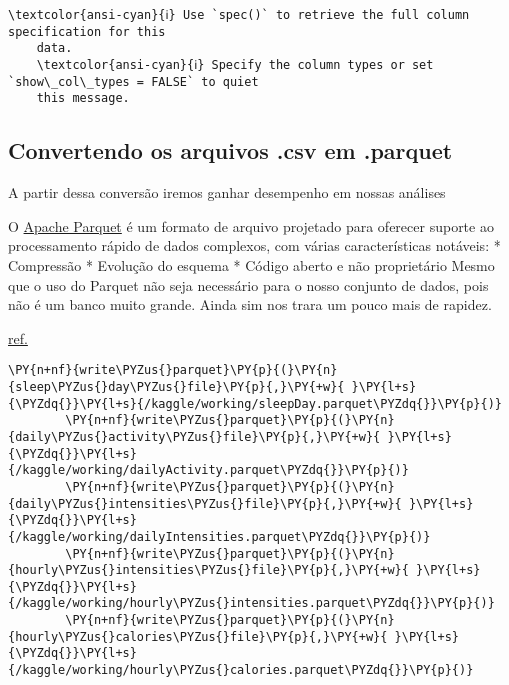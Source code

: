 \begin{Verbatim}[commandchars=\\\{\}]
    \textcolor{ansi-cyan}{ℹ} Use `spec()` to retrieve the full column specification for this
    data.
    \textcolor{ansi-cyan}{ℹ} Specify the column types or set `show\_col\_types = FALSE` to quiet
    this message.
\end{Verbatim}

\subsection{Convertendo os arquivos .csv em .parquet}

A partir dessa conversão iremos ganhar desempenho em nossas análises

O \href{https://www.upsolver.com/blog/apache-parquet-why-use}{Apache
    Parquet} é um formato de arquivo projetado para oferecer suporte ao
processamento rápido de dados complexos, com várias características
notáveis: * Compressão * Evolução do esquema * Código aberto e não
proprietário Mesmo que o uso do Parquet não seja necessário para o nosso
conjunto de dados, pois não é um banco muito grande. Ainda sim nos trara
um pouco mais de rapidez.

\begin{center}
\end{center}

\href{https://blog.openbridge.com/how-to-be-a-hero-with-powerful-parquet-google-and-amazon-f2ae0f35ee04}{ref.}

\begin{tcolorbox}[breakable, size=fbox, boxrule=1pt, pad at break*=1mm,colback=cellbackground, colframe=cellborder]
    \begin{Verbatim}[commandchars=\\\{\}]
        \PY{n+nf}{write\PYZus{}parquet}\PY{p}{(}\PY{n}{sleep\PYZus{}day\PYZus{}file}\PY{p}{,}\PY{+w}{ }\PY{l+s}{\PYZdq{}}\PY{l+s}{/kaggle/working/sleepDay.parquet\PYZdq{}}\PY{p}{)}
        \PY{n+nf}{write\PYZus{}parquet}\PY{p}{(}\PY{n}{daily\PYZus{}activity\PYZus{}file}\PY{p}{,}\PY{+w}{ }\PY{l+s}{\PYZdq{}}\PY{l+s}{/kaggle/working/dailyActivity.parquet\PYZdq{}}\PY{p}{)}
        \PY{n+nf}{write\PYZus{}parquet}\PY{p}{(}\PY{n}{daily\PYZus{}intensities\PYZus{}file}\PY{p}{,}\PY{+w}{ }\PY{l+s}{\PYZdq{}}\PY{l+s}{/kaggle/working/dailyIntensities.parquet\PYZdq{}}\PY{p}{)}
        \PY{n+nf}{write\PYZus{}parquet}\PY{p}{(}\PY{n}{hourly\PYZus{}intensities\PYZus{}file}\PY{p}{,}\PY{+w}{ }\PY{l+s}{\PYZdq{}}\PY{l+s}{/kaggle/working/hourly\PYZus{}intensities.parquet\PYZdq{}}\PY{p}{)}
        \PY{n+nf}{write\PYZus{}parquet}\PY{p}{(}\PY{n}{hourly\PYZus{}calories\PYZus{}file}\PY{p}{,}\PY{+w}{ }\PY{l+s}{\PYZdq{}}\PY{l+s}{/kaggle/working/hourly\PYZus{}calories.parquet\PYZdq{}}\PY{p}{)}
    \end{Verbatim}
\end{tcolorbox}

